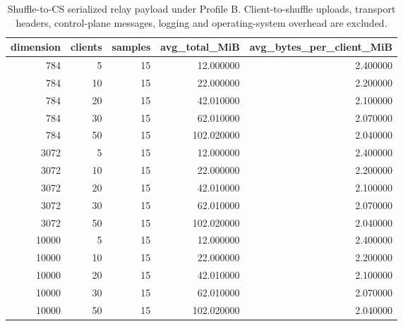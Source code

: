 \begin{table}
\caption{Shuffle-to-CS serialized relay payload under Profile B. Client-to-shuffle uploads, transport headers, control-plane messages, logging and operating-system overhead are excluded.}
\label{tab:eval-communication}
\begin{tabular}{rrrrr}
\toprule
dimension & clients & samples & avg_total_MiB & avg_bytes_per_client_MiB \\
\midrule
784 & 5 & 15 & 12.000000 & 2.400000 \\
784 & 10 & 15 & 22.000000 & 2.200000 \\
784 & 20 & 15 & 42.010000 & 2.100000 \\
784 & 30 & 15 & 62.010000 & 2.070000 \\
784 & 50 & 15 & 102.020000 & 2.040000 \\
3072 & 5 & 15 & 12.000000 & 2.400000 \\
3072 & 10 & 15 & 22.000000 & 2.200000 \\
3072 & 20 & 15 & 42.010000 & 2.100000 \\
3072 & 30 & 15 & 62.010000 & 2.070000 \\
3072 & 50 & 15 & 102.020000 & 2.040000 \\
10000 & 5 & 15 & 12.000000 & 2.400000 \\
10000 & 10 & 15 & 22.000000 & 2.200000 \\
10000 & 20 & 15 & 42.010000 & 2.100000 \\
10000 & 30 & 15 & 62.010000 & 2.070000 \\
10000 & 50 & 15 & 102.020000 & 2.040000 \\
\bottomrule
\end{tabular}
\end{table}
